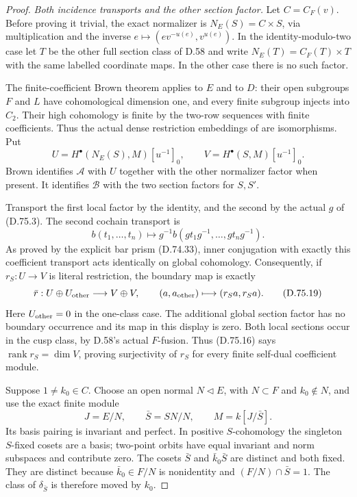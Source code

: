 \begin{proof}
\emph{Both incidence transports and the other section factor.}
Let $C=C_F(v)$.  Before proving it trivial,
the exact normalizer is
$N_E(S)=C\times S$, via multiplication and the
inverse $e\mapsto(ev^{-u(e)},v^{u(e)})$.
In the identity-modulo-two case let $T$ be the
other full section class of D.58 and write
$N_E(T)=C_F(T)\times T$ with the same labelled
coordinate maps.  In the other case there is
no such factor.

The finite-coefficient Brown theorem applies to
$E$ and to $D$: their open subgroups $F$ and
$L$ have cohomological dimension one, and every
finite subgroup injects into $C_2$.  Their high
cohomology is finite by the two-row sequences
with finite coefficients.  Thus the actual
dense restriction embeddings of
\cite[Theorem~2 and Section~1.1]
{A-KochloukovaZalesskii2007} are isomorphisms.
Put
\[
 U=H^\bullet(N_E(S),M)[u^{-1}]_0,\qquad
 V=H^\bullet(S,M)[u^{-1}]_0 .
                                                               \tag{D.75.17}
\]
Brown identifies $\mathcal A$ with $U$ together
with the other normalizer factor when present.
It identifies $\mathcal B$ with the two section
factors for $S,S'$.

Transport the first local factor by the identity,
and the second by the actual $g$ of (D.75.3).
The second cochain transport is
\[
 b(t_1,\ldots,t_n)\longmapsto
             g^{-1}b(gt_1g^{-1},\ldots,gt_ng^{-1}).
                                                               \tag{D.75.18}
\]
As proved by the explicit bar prism (D.74.33),
inner conjugation with exactly this coefficient
transport acts identically on global cohomology.
Consequently, if $r_S:U\to V$ is literal
restriction, the boundary map is exactly
\[
        \bar r:U\oplus U_{\rm other}\longrightarrow V\oplus V,
                 \qquad (a,a_{\rm other})
                             \longmapsto(r_Sa,r_Sa).
                                                               \tag{D.75.19}
\]
Here $U_{\rm other}=0$ in the one-class case.
The additional global section factor has no
boundary occurrence and its map in this
display is zero.  Both local sections occur
in the cusp class, by D.58's actual $F$-fusion.
Thus (D.75.16) says
$\operatorname{rank}r_S=\dim V$, proving
surjectivity of $r_S$ for every finite
self-dual coefficient module.

Suppose $1\ne k_0\in C$.  Choose an open normal
$N\triangleleft E$, with $N\subset F$ and
$k_0\notin N$, and use the exact finite module
\[
              J=E/N,\qquad \bar S=SN/N,\qquad
                             M=k[J/\bar S].
                                                               \tag{D.75.20}
\]
Its basis pairing is invariant and perfect.
In positive $S$-cohomology the singleton
$S$-fixed cosets are a basis; two-point orbits
have equal invariant and norm subspaces and
contribute zero.  The cosets $\bar S$ and
$\bar k_0\bar S$ are distinct and both fixed.
They are distinct because $\bar k_0\in F/N$
is nonidentity and $(F/N)\cap\bar S=1$.
The class of $\delta_{\bar S}$ is therefore
moved by $k_0$.


\end{proof}
